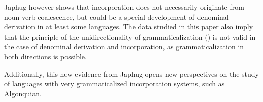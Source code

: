 \documentclass[oldfontcommands,oneside,a4paper,11pt]{article}
\begin{document}
Japhug however shows that incorporation does not necessarily originate from noun-verb coalescence, but could be a special development of denominal derivation in at least some languages. The data studied in this paper also imply that the principle of the   unidirectionality of grammaticalization (\citealt[57]{haspelmath90passive}) is not valid in the case of denominal derivation and incorporation, as grammaticalization in both directions is possible.


Additionally, this new evidence from Japhug opens new perspectives on the study of languages with very grammaticalized incorporation systems, such as Algonquian. 





\end{document}
